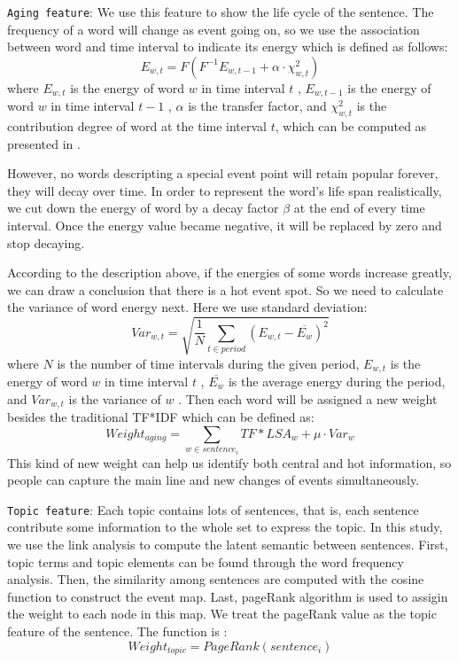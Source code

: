 \documentclass{acm_proc_article-sp}
\begin{document}
\texttt{Aging feature}: We use this feature to show the life cycle of the sentence. The frequency of a word will change as event going on, so we use the association between word  and time interval  to indicate its energy which is defined as follows:
\begin{equation}
  E_{w,t} =F(F^{-1}E_{w,t-1}+\alpha\cdot\chi^2_{w,t})
\end{equation}
where $E_{w,t}$ is the energy of word $w$  in time interval $t$ , $E_{w,t-1}$  is the energy of word $w$ in time interval $t-1$ , $\alpha$ is the transfer factor, and $\chi^2_{w,t}$  is the contribution degree of word  at the time interval $t$, which can be computed as presented in \cite{2000-Swan-p49-56}. 

However, no words descripting a special event point will retain popular forever, they will decay over time. In order to represent the word's life span realistically, we cut down the energy of word by a decay factor $\beta$ at the end of every time interval.
Once the energy value became negative, it will be replaced by zero and stop decaying.


According to the description above, if the energies of some words increase greatly, we can draw a conclusion that there is a hot event spot. So we need to calculate the variance of word energy next. Here we use standard deviation:
\begin{equation}
Var_{w,t} = \sqrt{ \frac{1}{N} \sum_{t \in period}(E_{w,t}- \overline{E_{w}})^2}
\end{equation}
where $N$ is the number of time intervals during the given period, $E_{w,t}$  is the energy of word $w$  in time interval $t$ , $\overline{E_{w}}$  is the average energy during the period, and $Var_{w,t}$  is the variance of $w$ .
Then each word will be assigned a new weight besides the traditional TF*IDF which can be defined as:
 \begin{equation}
Weight_{aging}=\sum_{w \in sentence_i}TF*LSA_{w} + \mu \cdot Var_{w}
\end{equation}
This kind of new weight can help us identify both central and hot information, so people can capture the main line and new changes of events simultaneously.

\texttt{Topic feature}: Each topic contains lots of sentences, that is, each sentence contribute some information to the whole set to express the topic. In this study, we use the link analysis to compute the latent semantic between sentences. First, topic terms and topic elements can be found through the word frequency analysis. Then, the similarity among sentences are computed with the cosine function to construct the event map. Last, pageRank algorithm is used to assigin the weight to each node in this map. We treat the pageRank value as the topic feature of the sentence. The function is :
\begin{equation}
Weight_{topic} = PageRank(sentence_i)
\end{equation}
\end{document}
